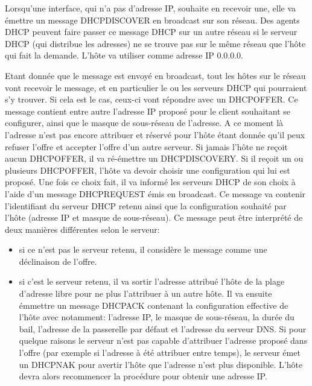 Lorsqu'une interface, qui n'a pas d'adresse IP, souhaite en recevoir une, elle
va émettre un message DHCPDISCOVER en broadcast sur son réseau. Des agents DHCP
peuvent faire passer
ce message DHCP sur un autre réseau si le serveur DHCP (qui distribue les
adresses) ne se trouve pas sur le même réseau que l'hôte qui fait la demande.
L'hôte va utiliser comme adresse IP 0.0.0.0.

Etant donnée que le message est envoyé en broadcast, tout les hôtes sur le
réseau vont recevoir le message, et en particulier le ou les serveurs DHCP qui
pourraient s'y trouver. Si cela est le cas, ceux-ci vont répondre avec un
DHCPOFFER. Ce message contient entre autre l'adresse IP proposé pour le client
souhaitant se configurer, ainsi que le masque de sous-réseau de l'adresse. A ce
moment là l'adresse n'est pas encore attribuer et réservé pour l'hôte étant
donnée qu'il peux refuser l'offre et accepter l'offre d'un autre serveur. Si
jamais l'hôte ne reçoit aucun DHCPOFFER, il va ré-émettre un DHCPDISCOVERY. Si
il reçoit un ou plusieurs DHCPOFFER, l'hôte va devoir choisir une configuration
qui lui est proposé. Une fois ce choix fait, il va informé les serveurs DHCP de
son choix à l'aide d'un message DHCPREQUEST émis en broadcast. Ce message va
contenir l'identifiant du serveur DHCP retenu ainsi que la configuration
souhaité par l'hôte (adresse IP et masque de sous-réseau). Ce message peut être
interprété de deux manières différentes selon le serveur:
\begin{itemize}
\item si ce n'est pas le serveur retenu, il considère le message comme une
déclinaison de l'offre.

\item si c'est le serveur retenu, il va sortir l'adresse attribué l'hôte de la
plage d'adresse libre pour ne plus l'attribuer à un autre hôte. Il va ensuite
émmettre un message DHCPACK contenant la configuration effective de l'hôte avec
notamment: l'adresse IP, le masque de sous-réseau, la durée du bail, l'adresse
de la passerelle par défaut et l'adresse du serveur DNS.  Si pour quelque
raisons le serveur n'est pas capable d'attribuer l'adresse proposé dans l'offre
(par exemple si l'adresse à été attribuer entre temps), le serveur émet un
DHCPNAK pour avertir l'hôte que l'adresse n'est plus disponible. L'hôte devra
alors recommencer la procédure pour obtenir une adresse IP.
\end{itemize}


